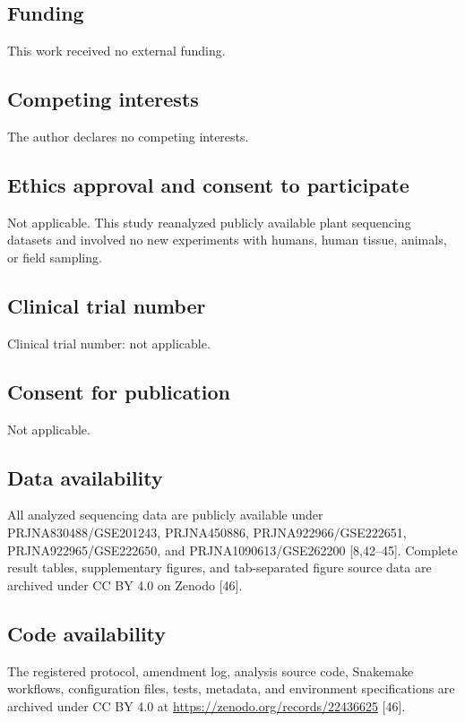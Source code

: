 \documentclass[referee,pdflatex,sn-basic,Numbered]{sn-jnl}
\begin{document}
\subsection*{Funding}

This work received no external funding.

\subsection*{Competing interests}

The author declares no competing interests.

\subsection*{Ethics approval and consent to participate}

Not applicable. This study reanalyzed publicly available plant sequencing datasets and involved no new experiments with humans, human tissue, animals, or field sampling.

\subsection*{Clinical trial number}

Clinical trial number: not applicable.

\subsection*{Consent for publication}

Not applicable.

\subsection*{Data availability}

All analyzed sequencing data are publicly available under PRJNA830488/GSE201243, PRJNA450886, PRJNA922966/GSE222651, PRJNA922965/GSE222650, and PRJNA1090613/GSE262200 [8,42--45]. Complete result tables, supplementary figures, and tab-separated figure source data are archived under CC BY 4.0 on Zenodo [46].

\subsection*{Code availability}

The registered protocol, amendment log, analysis source code, Snakemake workflows, configuration files, tests, metadata, and environment specifications are archived under CC BY 4.0 at \url{https://zenodo.org/records/22436625} [46].
\end{document}
